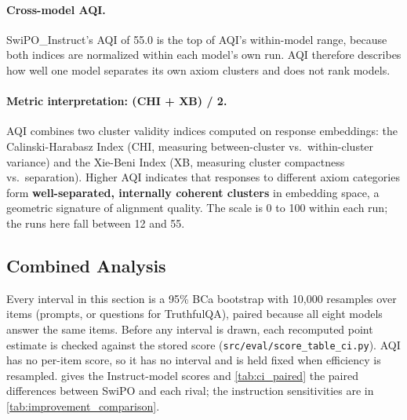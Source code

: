 \paragraph{Cross-model AQI.}
SwiPO\_Instruct's AQI of 55.0 is the top of AQI's within-model range, because both indices are normalized within each model's own run. AQI therefore describes how well one model separates its own axiom clusters and does not rank models.

\paragraph{Metric interpretation: (CHI + XB) / 2.}
AQI combines two cluster validity indices computed on response embeddings: the Calinski-Harabasz Index (CHI, measuring between-cluster vs.\ within-cluster variance) and the Xie-Beni Index (XB, measuring cluster compactness vs.\ separation).
Higher AQI indicates that responses to different axiom categories form \textbf{well-separated, internally coherent clusters} in embedding space, a geometric signature of alignment quality.
The scale is 0 to 100 within each run; the runs here fall between 12 and 55.

\vspace{-1mm}
\subsection{Combined Analysis}
\label{sec:combined_analysis}

Every interval in this section is a 95\% BCa bootstrap with 10,000 resamples over items (prompts, or questions for TruthfulQA), paired because all eight models answer the same items. Before any interval is drawn, each recomputed point estimate is checked against the stored score (\texttt{src/eval/score\_table\_ci.py}). AQI has no per-item score, so it has no interval and is held fixed when efficiency is resampled.  gives the Instruct-model scores and \cref{tab:ci_paired} the paired differences between SwiPO and each rival; the instruction sensitivities are in \cref{tab:improvement_comparison}.

